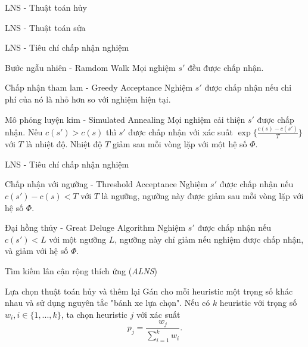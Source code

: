 \begin{frame}{LNS - Thuật toán hủy}
  
\end{frame}

\begin{frame}{LNS - Thuật toán sửa}
  
\end{frame}

\begin{frame}{LNS - Tiêu chí chấp nhận nghiệm}
    \begin{block}{Bước ngẫu nhiên - Ramdom Walk}
      Mọi nghiệm $s'$ đều được chấp nhận.
    \end{block}
    \begin{block}{Chấp nhận tham lam - Greedy Acceptance}
      Nghiệm $s'$ được chấp nhận nếu chi phí của nó là nhỏ hơn so với nghiệm hiện tại.
    \end{block}
    \begin{block}{Mô phỏng luyện kim - Simulated Annealing}
      Mọi nghiệm cải thiện $s'$ được chấp nhận. Nếu $c(s') > c(s)$ thì $s'$ được chấp nhận với xác suất $\exp \{ \frac{c(s) - c(s')}{T} \}$ với $T$ là nhiệt độ. Nhiệt độ $T$ giảm sau mỗi vòng lặp với một hệ số $\Phi$.
    \end{block}
\end{frame}

\begin{frame}{LNS - Tiêu chí chấp nhận nghiệm}
  \begin{block}{Chấp nhận với ngưỡng - Threshold Acceptance}
    Nghiệm $s'$ được chấp nhận nếu $c(s') - c(s) < T$ với $T$ là ngưỡng, ngưỡng này được giảm sau mỗi vòng lặp với hệ số $\Phi$.
  \end{block}
  
  \begin{block}{Đại hồng thủy - Great Deluge Algorithm}
    Nghiệm $s'$ được chấp nhận nếu $c(s') < L$ với một ngưỡng $L$, ngưỡng này chỉ giảm nếu nghiệm được chấp nhận, và giảm với hệ số $\Phi$.
  \end{block}
\end{frame}

\begin{frame}{Tìm kiếm lân cận rộng thích ứng (\textit{ALNS})}
  \begin{block}{Lựa chọn thuật toán hủy và thêm lại}
    Gán cho mỗi heuristic một trọng số khác nhau và sử dụng nguyên tắc "bánh xe lựa chọn". Nếu có $k$ heuristic với trọng số $w_i, i \in \{1,...,k\}$, ta chọn heuristic $j$ với xác suất
    \begin{equation}
      \label{eq:select}
      p_j = \frac{w_j}{\sum_{i=1}^k w_i}.
    \end{equation}
  \end{block}
\end{frame}

